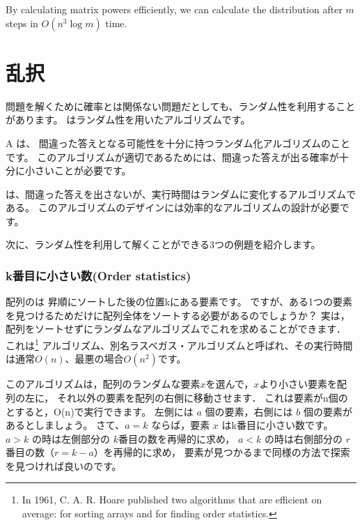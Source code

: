 By calculating matrix powers efficiently,
we can calculate the distribution after $m$ steps
in $O(n^3 \log m)$ time.

\section{乱択}


問題を解くために確率とは関係ない問題だとしても、ランダム性を利用することがあります。
はランダム性を用いたアルゴリズムです。


A  は、
間違った答えとなる可能性を十分に持つランダム化アルゴリズムのことです。
このアルゴリズムが適切であるためには、間違った答えが出る確率が十分に小さいことが必要です。


は、間違った答えを出さないが、実行時間はランダムに変化するアルゴリズムである。
このアルゴリズムのデザインには効率的なアルゴリズムの設計が必要です。

次に、ランダム性を利用して解くことができる3つの例題を紹介します。

\subsubsection{k番目に小さい数(Order statistics)}


配列のは
昇順にソートした後の位置kにある要素です。
ですが、ある1つの要素を見つけるためだけに配列全体をソートする必要があるのでしょうか？
実は，配列をソートせずにランダムなアルゴリズムでこれを求めることができます．
これは\footnote{In 1961,
C. A. R. Hoare published two algorithms that
are efficient on average:  
 \cite{hoa61a} for sorting arrays and
 \cite{hoa61b} for finding order statistics.}
アルゴリズム、別名ラスベガス・アルゴリズムと呼ばれ、その実行時間は通常$O(n)$、最悪の場合$O(n^2)$です。

このアルゴリズムは，配列のランダムな要素$x$を選んで，$x$より小さい要素を配列の左に，
それ以外の要素を配列の右側に移動させます．
これは要素がn個のとすると，O(n)で実行できます。
左側には $a$ 個の要素，右側には $b$ 個の要素があるとしましょう。
さて、$a = k$ ならば，要素 $x$ はk番目に小さい数です。
$a > k$ の時は左側部分の $k$番目の数を再帰的に求め，
$a < k$ の時は右側部分の $r$ 番目の数$（r = k - a）$を再帰的に求め，
要素が見つかるまで同様の方法で探索を見つければ良いのです。


